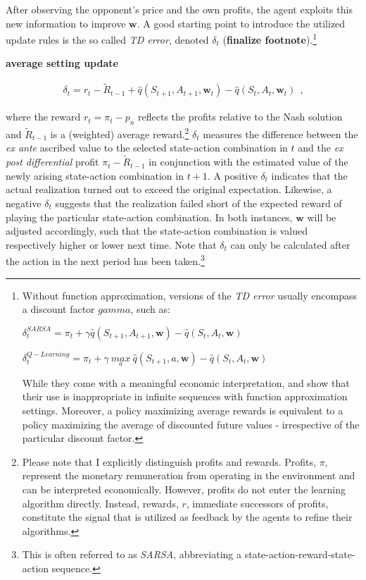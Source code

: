 After observing the opponent's price and the own profits, the agent exploits this new information to improve $\boldsymbol{w}$. A good starting point to introduce the utilized update rules is the so called \emph{TD error}, denoted $\delta_t$ (\textbf{finalize footnote}).\footnote{Without function approximation, versions of the \emph{TD error} usually encompass a discount factor $gamma$, such as:
	\begin{center}
		$\delta_t^{SARSA} = \pi_t + \gamma \hat{q}(S_{t+1}, A_{t+1}, \boldsymbol{w}) - \hat{q}(S_t, A_t, \boldsymbol{w})$
		
		$\delta_t^{Q-Learning} = \pi_t + \gamma ~ \underset{a}{max} ~ \hat{q}(S_{t+1}, a, \boldsymbol{w}) - \hat{q}(S_t, A_t, \boldsymbol{w})$
\end{center}
While they come with a meaningful economic interpretation, \textcite{sutton_reinforcement_2018} and \textcite{naik_discounted_2019} show that their use is inappropriate in infinite sequences with function approximation settings. Moreover, a policy maximizing average rewards is equivalent to a policy maximizing the average of discounted future values - irrespective of the particular discount factor.}

\textbf{average setting update}

\begin{gather}
	\delta_t = r_t - \widetilde{R}_{t-1} + \hat{q}(S_{t+1}, A_{t+1}, \boldsymbol{w}_t) - \hat{q}(S_t, A_t, \boldsymbol{w}_t) ~~   \text{,}
\end{gather}

where the reward $r_t = \pi_t - p_n$ reflects the profits relative to the Nash solution and $\widetilde{R}_{t-1}$ is a (weighted) average reward.\footnote{Please note that I explicitly distinguish profits and rewards. Profits, $\pi$, represent the monetary remuneration from operating in the environment and can be interpreted economically. However, profits do not enter the learning algorithm directly. Instead, rewards, $r$, immediate successors of profits, constitute the signal that is utilized as feedback by the agents to refine their algorithms.} $\delta_t$ measures the difference between the \emph{ex ante} ascribed value to the selected state-action combination in $t$ and the \emph{ex post} \emph{differential} profit $\pi_t - \widetilde{R}_{t-1}$ in conjunction with the estimated value of the newly arising state-action combination in $t+1$. A positive $\delta_t$ indicates that the actual realization turned out to exceed the original expectation. Likewise, a negative $\delta_t$ suggests that the realization failed short of the expected reward of playing the particular state-action combination. In both instances, $\boldsymbol{w}$ will be adjusted accordingly, such that the state-action combination is valued respectively higher or lower next time. Note that $\delta_t$ can only be calculated after the action in the next period has been taken.\footnote{This is often referred to as \emph{SARSA}, abbreviating a state-action-reward-state-action sequence.}



